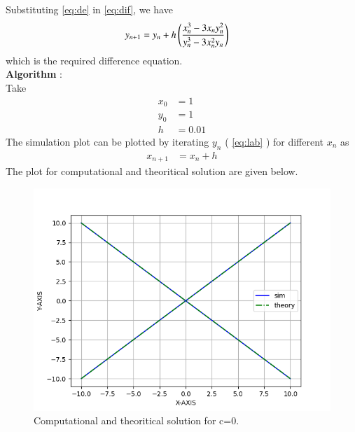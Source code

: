 \documentclass[journal]{IEEEtran}
\begin{document}
Substituting \eqref{eq:de} in \eqref{eq:dif}, we have 
\begin{align}
	y_{n+1} &= y_{n} + h \left(\frac{x_{n}^3 - 3x_{n}y_{n}^2}{y_{n}^3 - 3x_{n}^2y_{n}}\right) \label{eq:lab}
\end{align}
which is the required difference equation. \\
\textbf{Algorithm} : \\
Take
\begin{align}
	x_0 &= 1 \\
	y_0 &= 1 \\
	h &= 0.01 
\end{align}
The simulation plot can be plotted by iterating $y_{n}$ ( \eqref{eq:lab} ) for different $x_{n}$ as
\begin{align}
	x_{n+1} &= x_{n} + h 
\end{align}
The plot for computational and theoritical solution are given below.
\begin{figure}[h]
				 \centering
				 \includegraphics[width=\columnwidth]{figs/fig1.png}
				 \caption{Computational and theoritical solution for c=0.}
				 \label{fig:Plot1} 
			 \end{figure}



	
\end{document}
